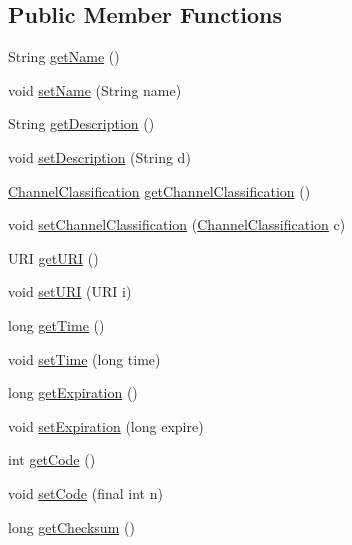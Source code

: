 \subsection*{Public Member Functions}
\begin{DoxyCompactItemize}
\item 
String \hyperlink{interfacegov_1_1fnal_1_1ppd_1_1dd_1_1signage_1_1SignageContent_abb7ff00f26a78f246315840f9ff3c81f}{get\-Name} ()
\item 
void \hyperlink{interfacegov_1_1fnal_1_1ppd_1_1dd_1_1signage_1_1SignageContent_aa294c7319aa6f4c71cdc1bb67fac7c4d}{set\-Name} (String name)
\item 
String \hyperlink{interfacegov_1_1fnal_1_1ppd_1_1dd_1_1signage_1_1SignageContent_a1d593870dfae0479501eaf97bb6f4bb7}{get\-Description} ()
\item 
void \hyperlink{interfacegov_1_1fnal_1_1ppd_1_1dd_1_1signage_1_1SignageContent_afb90451ca08e35471473d514cf671829}{set\-Description} (String d)
\item 
\hyperlink{classgov_1_1fnal_1_1ppd_1_1dd_1_1changer_1_1ChannelClassification}{Channel\-Classification} \hyperlink{interfacegov_1_1fnal_1_1ppd_1_1dd_1_1signage_1_1SignageContent_af70a2ffc728ecec3cfa9075c93b8f9b8}{get\-Channel\-Classification} ()
\item 
void \hyperlink{interfacegov_1_1fnal_1_1ppd_1_1dd_1_1signage_1_1SignageContent_a75a9a3ce37e847772ff866aabb8a2788}{set\-Channel\-Classification} (\hyperlink{classgov_1_1fnal_1_1ppd_1_1dd_1_1changer_1_1ChannelClassification}{Channel\-Classification} c)
\item 
U\-R\-I \hyperlink{interfacegov_1_1fnal_1_1ppd_1_1dd_1_1signage_1_1SignageContent_afd665283ce4c195fddc9e53db55989fe}{get\-U\-R\-I} ()
\item 
void \hyperlink{interfacegov_1_1fnal_1_1ppd_1_1dd_1_1signage_1_1SignageContent_a59c75e24dcec3ea729297104328a7852}{set\-U\-R\-I} (U\-R\-I i)
\item 
long \hyperlink{interfacegov_1_1fnal_1_1ppd_1_1dd_1_1signage_1_1SignageContent_a460e0a1acc526f39da30a2ab508fe083}{get\-Time} ()
\item 
void \hyperlink{interfacegov_1_1fnal_1_1ppd_1_1dd_1_1signage_1_1SignageContent_aa06f8e1789f16e9ba36520c26b852a60}{set\-Time} (long time)
\item 
long \hyperlink{interfacegov_1_1fnal_1_1ppd_1_1dd_1_1signage_1_1SignageContent_abb88634660b49fdbff2877a0699bcac1}{get\-Expiration} ()
\item 
void \hyperlink{interfacegov_1_1fnal_1_1ppd_1_1dd_1_1signage_1_1SignageContent_a2a60873657be44f167ce0fdc582af179}{set\-Expiration} (long expire)
\item 
int \hyperlink{interfacegov_1_1fnal_1_1ppd_1_1dd_1_1signage_1_1SignageContent_a3dc6baeec235eea0df5d74a2a7c99599}{get\-Code} ()
\item 
void \hyperlink{interfacegov_1_1fnal_1_1ppd_1_1dd_1_1signage_1_1SignageContent_a161670495469c9985fea14548d3a2943}{set\-Code} (final int n)
\item 
long \hyperlink{interfacegov_1_1fnal_1_1ppd_1_1dd_1_1signage_1_1SignageContent_aa1e28916946037eaa2b042c39aa2fa5f}{get\-Checksum} ()
\end{DoxyCompactItemize}


